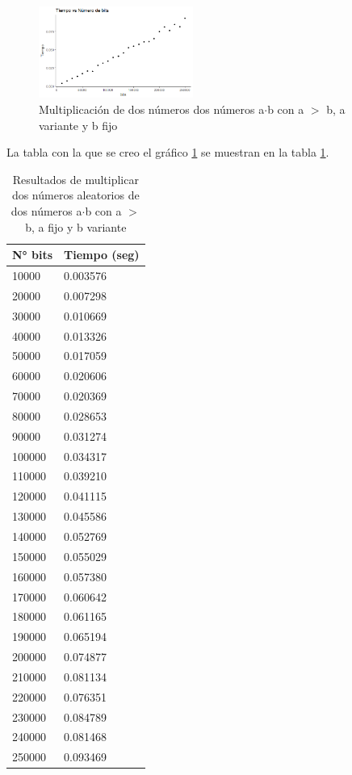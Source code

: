 \documentclass[10pt,journal,compsoc]{IEEEtran}
\begin{document}
\begin{figure}[!h]
    \centering
    \includegraphics[width=0.45\textwidth]{result3}
    \caption{Multiplicación de dos números dos números a$\cdot$b con a $>$ b, a variante y b fijo}
    \label{fig:result3}
\end{figure}


La tabla con la que se creo el gráfico \ref{fig:result3} se muestran en la tabla \ref{tab:result3}.


\begin{table}[h]
\centering
\caption{Resultados de multiplicar dos números aleatorios de dos números a$\cdot$b con a $>$ b,  a fijo y b variante}
\label{tab:result3}
\begin{tabular}{|l|l|}
\hline
N° bits & Tiempo (seg) \\ \hline
10000  & 0.003576 \\ \hline
20000  & 0.007298 \\ \hline
30000  & 0.010669 \\ \hline
40000  & 0.013326 \\ \hline
50000  & 0.017059 \\ \hline
60000  & 0.020606 \\ \hline
70000  & 0.020369 \\ \hline
80000  & 0.028653 \\ \hline
90000  & 0.031274 \\ \hline
100000 & 0.034317 \\ \hline
110000 & 0.039210 \\ \hline
120000 & 0.041115 \\ \hline
130000 & 0.045586 \\ \hline
140000 & 0.052769 \\ \hline
150000 & 0.055029 \\ \hline
160000 & 0.057380 \\ \hline
170000 & 0.060642 \\ \hline
180000 & 0.061165 \\ \hline
190000 & 0.065194 \\ \hline
200000 & 0.074877 \\ \hline
210000 & 0.081134 \\ \hline
220000 & 0.076351 \\ \hline
230000 & 0.084789 \\ \hline
240000 & 0.081468 \\ \hline
250000 & 0.093469 \\ \hline
\end{tabular}
\end{table}
\end{document}
